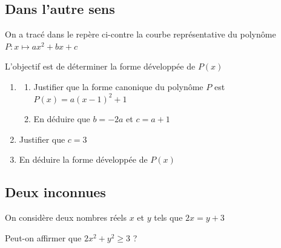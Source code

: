 \documentclass[oneside,12pt]{article}          %
\begin{document}
\subsection{Dans l'autre sens}
\begin{minipage}{0.35\linewidth} 
\end{minipage} \hspace{5mm}
\begin{minipage}{0.6\linewidth}
	On a tracé dans le repère ci-contre la courbe représentative du polynôme $P:x\mapsto ax^2+bx+c$ 
	
	L'objectif est de déterminer la forme développée de $P(x)$
	\begin{enumerate}
		\item \begin{enumerate}
			\item Justifier que la forme canonique du polynôme $P$ est $P(x)=a(x-1)^2+1$
			\item En déduire que $b=-2a$ et $c=a+1$
		\end{enumerate}
		\item Justifier que $c=3$
		\item En déduire la forme développée de $P(x)$
	\end{enumerate}
\end{minipage}



\subsection{Deux inconnues}
On considère deux nombres réels $x$ et $y$ tels que $2x=y+3$

Peut-on affirmer que $2x^2+y^2 \geq 3$ ?
\end{document}
